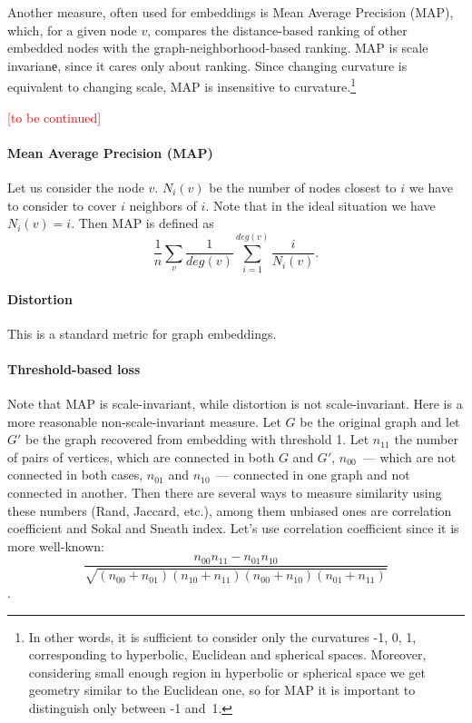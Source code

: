 \documentclass{article} %
\begin{document}
Another measure, often used for embeddings is Mean Average Precision (MAP), which, for a given node $v$, compares the distance-based ranking of other embedded nodes with the graph-neighborhood-based ranking. MAP is scale invarianе, since it cares only about ranking. Since changing curvature is equivalent to changing scale, MAP is insensitive to curvature.\footnote{In other words, it is sufficient to consider only the curvatures -1, 0, 1, corresponding to hyperbolic, Euclidean and spherical spaces. Moreover, considering small enough region in hyperbolic or spherical space we get geometry similar to the Euclidean one, so for MAP it is important to distinguish only between -1 and~1.}

\textcolor{red}{[to be continued]}

\iffalse

\paragraph{Mean Average Precision (MAP)}

Let us consider the node $v$. $N_i(v)$ be the number of nodes closest to $i$ we have to consider to cover $i$ neighbors of $i$. Note that in the ideal situation we have $N_i(v) = i$. Then MAP is defined as 
\[
\frac{1}{n} \sum_v \frac{1}{deg(v)} \sum_{i=1}^{deg(v)} \frac{i}{N_i(v)}. 
\]

\paragraph{Distortion} This is a standard metric for graph embeddings.



\paragraph{Threshold-based loss}

Note that MAP is scale-invariant, while distortion is not scale-invariant. Here is a more reasonable non-scale-invariant measure. Let $G$ be the original graph and let $G'$ be the graph recovered from embedding with threshold 1.
Let $n_{11}$ the number of pairs of vertices, which are connected in both $G$ and $G'$, $n_{00}$~--- which are not connected in both cases, $n_{01}$ and $n_{10}$~--- connected in one graph and not connected in another. Then there are several ways to measure similarity using these numbers (Rand, Jaccard, etc.), among them unbiased ones are correlation coefficient and Sokal and Sneath index. Let's use correlation coefficient since it is more well-known: \[\frac{n_{00}n_{11} - n_{01}n_{10}}{\sqrt{(n_{00} + n_{01})(n_{10} + n_{11})(n_{00} + n_{10})(n_{01} + n_{11})}}\].
\end{document}
